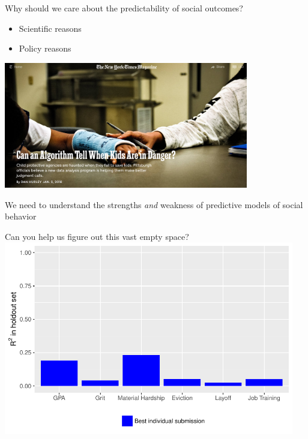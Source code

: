 \documentclass{beamer}
\begin{document}
\begin{frame}

Why should we care about the predictability of social outcomes?
\begin{itemize}
\item Scientific reasons \pause
\item Policy reasons
\end{itemize}

\begin{center}
\includegraphics[width=0.8\textwidth]{figures/hurley_can_2018_title}
\end{center}

\vfill

We need to understand the strengths \emph{and} weakness of predictive models of social behavior
\end{frame}
\begin{frame}

\begin{center}
\Large Can you help us figure out this vast empty space?\\
\includegraphics[width=0.95\textwidth]{figures/Rsquared_all_01_bestindividual}
\end{center}

\end{frame}
\end{document}
